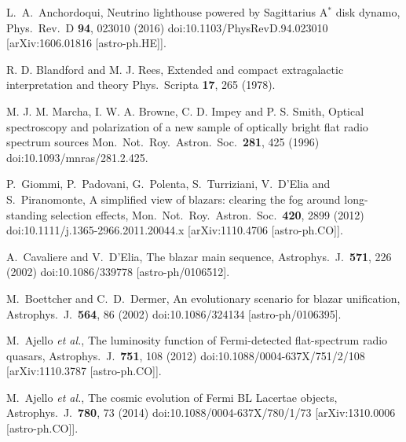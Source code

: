 \documentclass[aps,prd,twocolumn,superscriptaddress,tightenlines,nofootinbib]{revtex4-1}
\begin{document}
\begin{thebibliography}{99}
  L.~A.~Anchordoqui,
   {\color{rossoCP3} Neutrino lighthouse powered by Sagittarius A$^*$ disk dynamo},
  Phys.\ Rev.\ D {\bf 94}, 023010 (2016)
  doi:10.1103/PhysRevD.94.023010
  [arXiv:1606.01816 [astro-ph.HE]].

R. D. Blandford and M. J.  Rees, 
 {\color{rossoCP3} Extended and compact extragalactic interpretation and theory}
Phys.\ Scripta {\bf  17}, 265 (1978).


 M. J. M. Marcha, I. W. A. Browne, C. D. Impey and
  P. S. Smith,
 {\color{rossoCP3} Optical spectroscopy and polarization of a new sample of optically bright flat radio spectrum sources}
Mon.\ Not.\ Roy.\ Astron.\ Soc.\  {\bf 281}, 425 (1996)
 doi:10.1093/mnras/281.2.425.

  P.~Giommi, P.~Padovani, G.~Polenta, S.~Turriziani, V.~D'Elia and S.~Piranomonte,
   {\color{rossoCP3} A simplified view of blazars: clearing the fog around long-standing selection effects},
  Mon.\ Not.\ Roy.\ Astron.\ Soc.\  {\bf 420}, 2899 (2012)
  doi:10.1111/j.1365-2966.2011.20044.x
  [arXiv:1110.4706 [astro-ph.CO]].


  A.~Cavaliere and V.~D'Elia,
    {\color{rossoCP3}  The blazar main sequence},
  Astrophys.\ J.\  {\bf 571}, 226 (2002)
  doi:10.1086/339778
  [astro-ph/0106512].


  M.~Boettcher and C.~D.~Dermer,
    {\color{rossoCP3}  An evolutionary scenario for blazar unification},
  Astrophys.\ J.\  {\bf 564}, 86 (2002)
  doi:10.1086/324134
  [astro-ph/0106395].


  M.~Ajello {\it et al.},
    {\color{rossoCP3}  The luminosity function of Fermi-detected flat-spectrum radio quasars},
  Astrophys.\ J.\  {\bf 751}, 108 (2012)
  doi:10.1088/0004-637X/751/2/108
  [arXiv:1110.3787 [astro-ph.CO]].



  M.~Ajello {\it et al.},
    {\color{rossoCP3}  The cosmic evolution of Fermi BL Lacertae objects},
  Astrophys.\ J.\  {\bf 780}, 73 (2014)
  doi:10.1088/0004-637X/780/1/73
  [arXiv:1310.0006 [astro-ph.CO]].




\end{thebibliography}
\end{document}
